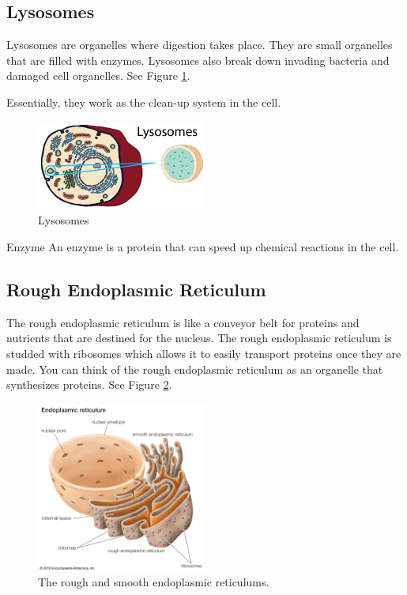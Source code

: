 \documentclass[12pt]{report}
\begin{document}
\subsection{Lysosomes}
\begin{definition}[Lysosomes]
    Lysosomes are organelles where digestion takes place. They are small organelles that are filled with enzymes. Lysosomes also break down invading bacteria and damaged cell organelles. See Figure \ref{fig:lysosomes}. 
\end{definition}

Essentially, they work as the clean-up system in the cell.

\begin{figure}[H]
\centering
    \includegraphics[width=0.5\textwidth]{../figures/lysosomes.png}
    \caption{Lysosomes}
    \label{fig:lysosomes}
\end{figure}

\begin{note}{Enzyme}
    An enzyme is a protein that can speed up chemical reactions in the cell.
\end{note}

\subsection{Rough Endoplasmic Reticulum}
\begin{definition}
    The rough endoplasmic reticulum is like a conveyor belt for proteins and nutrients that are destined for the nucleus. The rough endoplasmic reticulum is studded with ribosomes which allows it to easily transport proteins once they are made. You can think of the rough endoplasmic reticulum as an organelle that synthesizes proteins. See Figure \ref{fig:endoplasmic-reticulum}. 
\end{definition}

\begin{figure}[H]
\centering
    \includegraphics[width=0.5\textwidth]{../figures/endoplasmic-reticulum.png}
    \caption{The rough and smooth endoplasmic reticulums.}
    \label{fig:endoplasmic-reticulum}
\end{figure}
\end{document}
